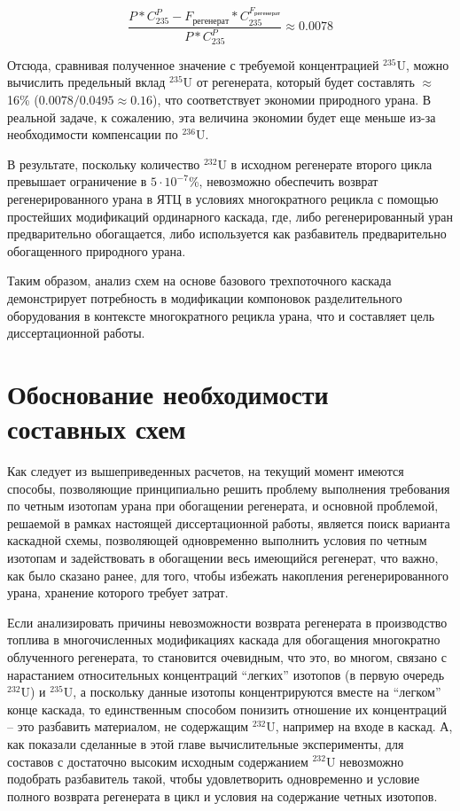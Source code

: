 \begin{equation}
  \label{eq_235_balance_X}
   \frac{P*C_{235}^{P} - F_{регенерат}*C_{235}^{F_{регенерат}}}{P*C_{235}^{P}} \approx 0.0078
\end{equation}

Отсюда, сравнивая полученное значение с требуемой концентрацией $^{235}$U, можно вычислить предельный вклад $^{235}$U от регенерата, который будет составлять $\approx$16\% ($0.0078/0.0495\approx0.16$), что соответствует экономии природного урана. В реальной задаче, к сожалению, эта величина экономии будет еще меньше из-за необходимости компенсации по $^{236}$U.

В результате, поскольку количество $^{232}$U в исходном регенерате второго цикла превышает ограничение в $5\cdot10^{-7}$\%, невозможно обеспечить возврат регенерированного урана в ЯТЦ в условиях многократного рецикла с помощью простейших модификаций ординарного каскада, где, либо регенерированный уран предварительно обогащается, либо используется как разбавитель предварительно обогащенного природного урана.

Таким образом, анализ схем на основе базового трехпоточного каскада демонстрирует потребность в модификации компоновок разделительного оборудования в контексте многократного рецикла урана, что и составляет цель диссертационной работы.


\section{Обоснование необходимости составных схем}\label{sec:ch2/sec2}

Как следует из вышеприведенных расчетов, на текущий момент имеются способы, позволяющие принципиально решить проблему выполнения требования по четным изотопам урана при обогащении регенерата, и основной проблемой, решаемой в рамках настоящей диссертационной работы, является поиск варианта каскадной схемы, позволяющей одновременно выполнить условия по четным изотопам и задействовать в обогащении весь имеющийся регенерат, что важно, как было сказано ранее, для того, чтобы избежать накопления регенерированного урана, хранение которого требует затрат.

Если анализировать причины невозможности возврата регенерата в производство топлива в многочисленных модификациях каскада для обогащения многократно облученного регенерата, то становится очевидным, что это, во многом, связано с нарастанием относительных концентраций “легких” изотопов (в первую очередь $^{232}$U) и
$^{235}$U, а поскольку данные изотопы концентрируются вместе на “легком” конце каскада, то единственным способом понизить отношение их концентраций -- это разбавить материалом, не содержащим $^{232}$U, например на входе в каскад. А, как показали сделанные в этой главе вычислительные эксперименты, для составов с достаточно высоким исходным содержанием $^{232}$U невозможно подобрать разбавитель такой, чтобы удовлетворить одновременно и условие полного возврата регенерата в цикл и условия на содержание четных изотопов.

